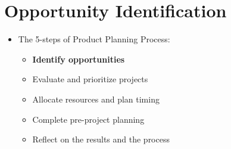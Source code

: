 \documentclass[openany,12pt,a4paper]{book}
\begin{document}
\chapter{Opportunity Identification}
\begin{itemize}
    \item The 5-steps of Product Planning Process:
    \begin{itemize}
        \item \textbf{Identify opportunities}
        \item Evaluate and prioritize projects
        \item Allocate resources and plan timing
        \item Complete pre-project planning
        \item Reflect on the results and the process
    \end{itemize}
\end{itemize}
\end{document}
